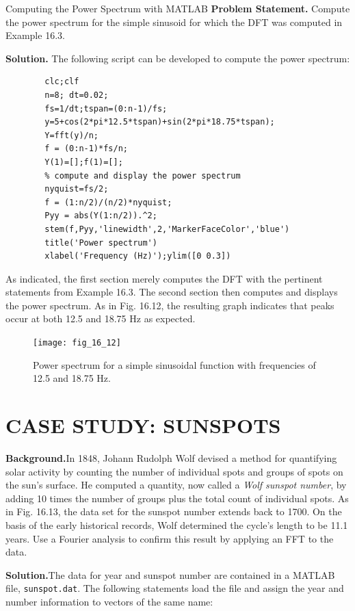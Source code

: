 \documentclass[../main.tex]{subfiles}
\begin{document}
\begin{example}  Computing the Power Spectrum with MATLAB
	\noindent \textbf{Problem Statement. } \quad Compute the power spectrum for the simple sinusoid for which the
	DFT was computed in Example 16.3.

	\noindent \textbf{Solution. } \quad  The following script can be developed to compute the power spectrum:

	\begin{lstlisting}[numbers=none]
		% compute the DFT
		clc;clf
		n=8; dt=0.02;
		fs=1/dt;tspan=(0:n-1)/fs;
		y=5+cos(2*pi*12.5*tspan)+sin(2*pi*18.75*tspan);
		Y=fft(y)/n;
		f = (0:n-1)*fs/n;
		Y(1)=[];f(1)=[];
		% compute and display the power spectrum
		nyquist=fs/2;
		f = (1:n/2)/(n/2)*nyquist;
		Pyy = abs(Y(1:n/2)).^2;
		stem(f,Pyy,'linewidth',2,'MarkerFaceColor','blue')
		title('Power spectrum')
		xlabel('Frequency (Hz)');ylim([0 0.3])
	\end{lstlisting}

	\noindent As indicated, the first section merely computes the DFT with the pertinent statements from
	Example 16.3. The second section then computes and displays the power spectrum. As in
	Fig. 16.12, the resulting graph indicates that peaks occur at both 12.5 and 18.75 Hz as
	expected.

	\begin{figure}[H] 
		\centering
		\texttt{[image: fig\_16\_12]}
		\caption{\textsf{Power spectrum for a simple sinusoidal function with frequencies of 12.5 and 18.75 Hz.}}
		\label{fig:fig_16_12}
	\end{figure}
\end{example}

\section[CASE STUDY: SUNSPOTS]{CASE STUDY: SUNSPOTS}
\noindent\textbf{Background.}\quad  In 1848, Johann Rudolph Wolf devised a method for quantifying solar
activity by counting the number of individual spots and groups of spots on the sun's surface. He computed a quantity, now called a \textit{Wolf sunspot number}, by adding 10 times the
number of groups plus the total count of individual spots. As in Fig. 16.13, the data set for
the sunspot number extends back to 1700. On the basis of the early historical records, Wolf
determined the cycle's length to be 11.1 years. Use a Fourier analysis to confirm this result
by applying an FFT to the data.

\noindent\textbf{Solution.}\quad  The data for year and sunspot number are contained in a MATLAB file,
\texttt{sunspot.dat}. The following statements load the file and assign the year and number information to vectors of the same name:
\end{document}
